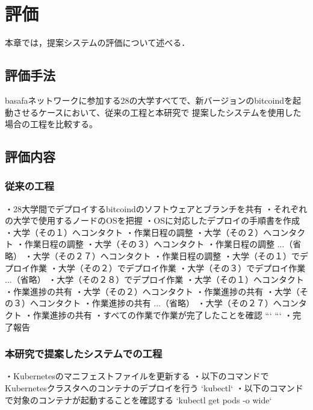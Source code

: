 \chapter{評価}
\label{evaluation}
本章では，提案システムの評価について述べる．

\section{評価手法}
\label{evaluation:method}

basafaネットワークに参加する28の大学すべてで、新バージョンのbitcoindを起動させるケースにおいて、従来の工程と本研究で
提案したシステムを使用した場合の工程を比較する。

\section{評価内容}
\label{evaluation:content}

\subsection{従来の工程}

・28大学間でデプロイするbitcoindのソフトウェアとブランチを共有
・それぞれの大学で使用するノードのOSを把握
・OSに対応したデプロイの手順書を作成
・大学（その１）へコンタクト
    ・作業日程の調整
・大学（その２）へコンタクト
    ・作業日程の調整
・大学（その３）へコンタクト
    ・作業日程の調整
...（省略）
・大学（その２７）へコンタクト
    ・作業日程の調整
・大学（その１）でデプロイ作業
・大学（その２）でデプロイ作業
・大学（その３）でデプロイ作業
...（省略）
・大学（その２８）でデプロイ作業
・大学（その１）へコンタクト
    ・作業進捗の共有
・大学（その２）へコンタクト
    ・作業進捗の共有
・大学（その３）へコンタクト
    ・作業進捗の共有
...（省略）
・大学（その２７）へコンタクト
    ・作業進捗の共有
・すべての作業で作業が完了したことを確認
```
```
・完了報告

\subsection{本研究で提案したシステムでの工程}

・Kubernetesのマニフェストファイルを更新する
・以下のコマンドでKubernetesクラスタへのコンテナのデプロイを行う
`kubectl`
・以下のコマンドで対象のコンテナが起動することを確認する
`kubectl get pods -o wide`

